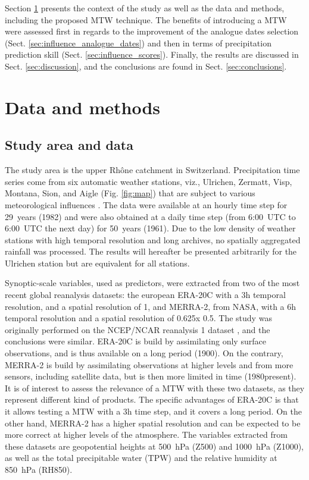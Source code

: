 \documentclass[hess, manuscript]{copernicus}
\begin{document}
	Section \ref{sec:data_methods} presents the context of the study as well as the data and methods, including the proposed MTW technique. The benefits of introducing a MTW were assessed first in regards to the improvement of the analogue dates selection (Sect. \ref{sec:influence_analogue_dates}) and then in terms of precipitation prediction skill (Sect. \ref{sec:influence_scores}). Finally, the results are discussed in Sect. \ref{sec:discussion}, and the conclusions are found in Sect. \ref{sec:conclusions}.
	
	
	\section{Data and methods}
	\label{sec:data_methods}
	
	\subsection{Study area and data}
	\label{sec:data}
	
	The study area is the upper Rh\^{o}ne catchment in Switzerland. Precipitation time series come from six automatic weather stations, viz., Ulrichen, Zermatt, Visp, Montana, Sion, and Aigle (Fig. \ref{fig:map}) that are subject to various meteorological influences \citep{Horton2012}. The data were available at an hourly time step for 29~years (1982) and were also obtained at a daily time step (from 6:00~UTC to 6:00~UTC the next day) for 50~years (1961). Due to the low density of weather stations with high temporal resolution and long archives, no spatially aggregated rainfall was processed. The results will hereafter be presented arbitrarily for the Ulrichen station but are equivalent for all stations.
	
	Synoptic-scale variables, used as predictors, were extracted from two of the most recent global reanalysis datasets: the european ERA-20C \citep{Poli2016} with a 3h temporal resolution, and a spatial resolution of 1\textdegree, and MERRA-2, from NASA, with a 6h temporal resolution and a spatial resolution of 0.625\textdegree x 0.5\textdegree. The study was originally performed on the NCEP/NCAR reanalysis 1 dataset \citep{Kalnay1996}, and the conclusions were similar. ERA-20C is build by assimilating only surface observations, and is thus available on a long period (1900). On the contrary, MERRA-2 is build by assimilating observations at higher levels and from more sensors, including satellite data, but is then more limited in time (1980\textendash present). It is of interest to assess the relevance of a MTW with these two datasets, as they represent different kind of products. The specific advantages of ERA-20C is that it allows testing a MTW with a 3h time step, and it covers a long period. On the other hand, MERRA-2 has a higher spatial resolution and can be expected to be more correct at higher levels of the atmosphere. The variables extracted from these datasets are geopotential heights at 500~hPa (Z500) and 1000~hPa (Z1000), as well as the total precipitable water (TPW) and the relative humidity at 850~hPa (RH850).
	
\end{document}
